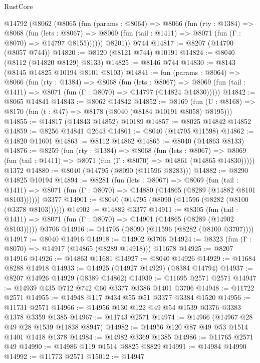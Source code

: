 \begin{lexlean}{RustCore}
\begin{coremodule}
    @14792
      (@8062
        (@8065
          (fun (params : @8064) =>
          @8066
            (fun (rty : @1384) =>
            @8068
              (fun (lets : @8067) =>
              @8069 (fun (tail : @1411) => @8071 (fun (Γ : @8070) => @14797 @8155))))))
        @8201))
    @744
@14817 := @8207 (@14790 (@8057 @744))
@14820 := @8120 (@8121 @744) @10191
@14824 := @8040 (@8112 (@14820 @8129) @8133)
@14825 := @8146 @744
@14830 := @8143 (@8145 @14825 @10194 @8101 @8103)
@14841 := fun (params : @8064) =>
  @8066
    (fun (rty : @1384) =>
    @8068
      (fun (lets : @8067) =>
      @8069 (fun (tail : @1411) => @8071 (fun (Γ : @8070) => @14797 (@14824 @14830)))))
@14842 := @8065 @14841
@14843 := @8062 @14842
@14852 := @8169
    (fun (U : @8168) => @8170 (fun (t : @47) => @8178 (@8040 (@8184 @10191 @8058) @8195)))
@14855 := @14817 (@14843 @14852) @10189
@14857 := @8025 @14842 @14852
@14859 := @8256 @14841 @2643
@14861 := @8040 (@14795 @11598)
@14862 := @14820 @11601
@14863 := @8112 @14862
@14865 := @8040 (@14863 @8133)
@14876 := @8259
    (fun (rty : @1384) =>
    @8068
      (fun (lets : @8067) =>
      @8069 (fun (tail : @1411) => @8071 (fun (Γ : @8070) => @14861 (@14865 @14830)))))
    @1372
@14880 := @8040 (@14795 (@8090 (@11596 @8283)))
@14882 := @8290 @14825 @10194
@14894 := @8281
    (fun (lets : @8067) =>
    @8069
      (fun (tail : @1411) =>
      @8071 (fun (Γ : @8070) => @14880 (@14865 (@8289 (@14882 @8101 @8103))))))
    @3377
@14901 := @8040 (@14795 (@8090 (@11596 (@8282 (@8100 (@3378 @8103))))))
@14902 := @14882 @3377
@14911 := @8305
    (fun (tail : @1411) => @8071 (fun (Γ : @8070) => @14901 (@14865 (@8289 (@14902 @8103)))))
    @3706
@14916 := @14795 (@8090 (@11596 (@8282 (@8100 @3707))))
@14917 := @8040 @14916
@14918 := @14902 @3706
@14924 := @8323 (fun (Γ : @8070) => @14917 (@14865 (@8289 @14918))) @11678
@14925 := @8207 @14916
@14926 := @14863 @11681
@14927 := @8040 @14926
@14929 := @11684 @8288 @14918
@14933 := @14925 (@14927 @14929) (@8384 @14794)
@14937 := @8207 @14926 @14929 (@8389 @14862)
@14939 := @11695 @2571 @2571
@14947 := @14939 @435 @712 @742 @66 @3377 @3386 @1401 @3706
@14948 := @11722 @2571
@14955 := @14948 @117 @434 @55 @51 @3377 @3384 @1520
@14956 := @11731 @2571
@14966 := @14956 @130 @122 @49 @54 @1539 @3376 @3383 @1378 @3359 @1385
@14967 := @11743 @2571
@14974 := @14966 (@14967 @28 @49 @28 @1539 @11838 @8947)
@14982 := @14956 @120 @87 @49 @53 @1514 @1401 @1418 @1378
@14984 := @14982 @3369 @1385
@14986 := @11765 @2571 @49
@14990 := @14986 @119 @1514 @8825 @8829
@14991 := @14984 @14990
@14992 := @11773 @2571
@15012 := @14947

\end{coremodule}
\end{lexlean}

